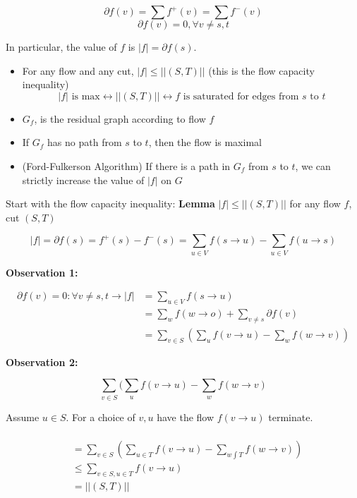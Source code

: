 \documentclass[12pt]{article}
\begin{document}
\begin{tcolorbox}[title=Theorem: Conservation]
	$$\partial f(v) = \sum f^+ (v) = \sum f^- (v)$$
	$$\partial f(v) = 0, \forall v \neq s,t$$
\end{tcolorbox}

In particular, the value of $f$ is $|f|=\partial f(s)$.

\begin{tcolorbox}[title=Min cut Max flow]
	\begin{itemize}
		\item{
		For any flow and any cut, $|f| \leq ||(S,T)||$ (this is the flow capacity inequality)\\
		$$|f| \text{ is max} \longleftrightarrow ||(S,T)|| \longleftrightarrow f \text{ is saturated for edges from $s$ to $t$}$$
		}
		\item{$G_f$, is the residual graph according to flow $f$}
		\item{If $G_f$ has no path from $s$ to $t$, then the flow is maximal}
		\item{(Ford-Fulkerson Algorithm) If there is a path in $G_f$ from $s$ to $t$, we can strictly increase the value of $|f|$ on $G$}
	\end{itemize}
\end{tcolorbox}

Start with the flow capacity inequality:
\textbf{Lemma} $|f| \leq ||(S,T)||$ for any flow $f$, cut $(S,T)$

$$|f| = \partial f(s) = f^+ (s) - f^- (s) = \sum_{u\in V} f(s \rightarrow u) - \sum_{u\in V} f(u\rightarrow s)$$

\textbf{Observation 1:} 

\begin{align*}
	\partial f(v) = 0 : \forall v \neq s,t \longrightarrow |f| &= \sum_{u\in V} f(s\rightarrow u)\\ 
	&= \sum_w f(w\rightarrow o) + \sum_{v \neq s} \partial f(v)\\
	&= \sum_{v \in S} (\sum_u f(v \rightarrow u) - \sum_w f(w\rightarrow v))
\end{align*}

\textbf{Observation 2:}

$$\sum_{v \in S} (\sum_u f(v\rightarrow u) - \sum_w f(w\rightarrow v)$$

Assume $u\in S$. For a choice of $v,u$ have the flow $f(v\rightarrow u)$ terminate.\\
\\
\begin{align*}
	&= \sum_{v\in S} (\sum_{u \in T} f(v\rightarrow u) - \sum_{w\int T} f(w\rightarrow v))\\
	&\leq \sum_{v\in S, u\in T} f(v\rightarrow u)\\
	&= ||(S,T)||
\end{align*}
\end{document}
